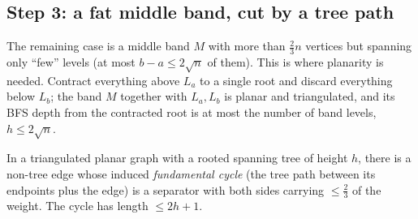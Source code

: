 \subsection{Step 3: a fat middle band, cut by a tree path}

The remaining case is a middle band $M$ with more than $\tfrac23 n$ vertices but spanning only ``few'' levels (at most $b-a\le 2\sqrt n$ of them). This is where planarity is needed. Contract everything above $L_a$ to a single root and discard everything below $L_b$; the band $M$ together with $L_a,L_b$ is planar and triangulated, and its BFS depth from the contracted root is at most the number of band levels, $h\le 2\sqrt n$.

\begin{lemma}\label{ch27:lem-cycle}
In a triangulated planar graph with a rooted spanning tree of height $h$, there is a non-tree edge whose induced \emph{fundamental cycle} (the tree path between its endpoints plus the edge) is a separator with both sides carrying $\le\tfrac23$ of the weight. The cycle has length $\le 2h+1$.
\end{lemma}


